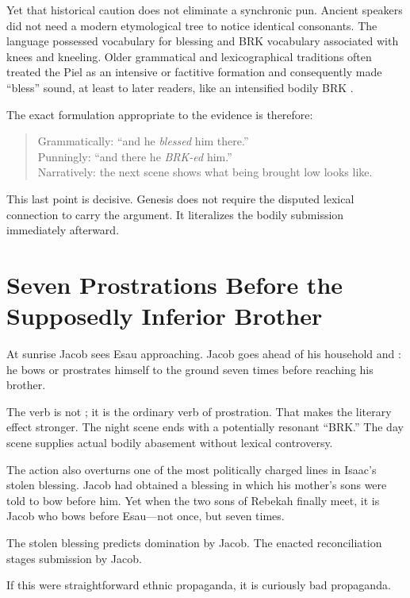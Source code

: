 Yet that historical caution does not eliminate a synchronic pun. Ancient speakers did not need a modern etymological tree to notice identical consonants. The language possessed  vocabulary for blessing and BRK vocabulary associated with knees and kneeling. Older grammatical and lexicographical traditions often treated the Piel as an intensive or factitive formation and consequently made ``bless'' sound, at least to later readers, like an intensified bodily BRK \parencite{Gesenius1910,BDB1907}.

The exact formulation appropriate to the evidence is therefore:

\begin{quote}\small
Grammatically: ``and he \emph{blessed} him there.''\\
Punningly: ``and there he \emph{BRK-ed} him.''\\
Narratively: the next scene shows what being brought low looks like.
\end{quote}

This last point is decisive. Genesis does not require the disputed lexical connection to carry the argument. It literalizes the bodily submission immediately afterward.

\section{Seven Prostrations Before the Supposedly Inferior Brother}

At sunrise Jacob sees Esau approaching. Jacob goes ahead of his household and : he bows or prostrates himself to the ground seven times before reaching his brother.

The verb is not ; it is the ordinary verb of prostration. That makes the literary effect stronger. The night scene ends with a potentially resonant ``BRK.'' The day scene supplies actual bodily abasement without lexical controversy.

The action also overturns one of the most politically charged lines in Isaac's stolen blessing. Jacob had obtained a blessing in which his mother's sons were told to bow before him. Yet when the two sons of Rebekah finally meet, it is Jacob who bows before Esau---not once, but seven times.

The stolen blessing predicts domination by Jacob. The enacted reconciliation stages submission by Jacob.

If this were straightforward ethnic propaganda, it is curiously bad propaganda.

